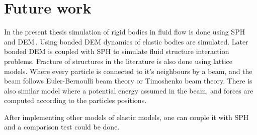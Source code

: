 \chapter{Future work}
\label{cha:future-work}


In the present thesis simulation of rigid bodies in fluid flow is done using SPH
and DEM\,. Using bonded DEM dynamics of elastic bodies are simulated.  Later
bonded DEM is coupled with SPH to simulate fluid structure interaction
problems. Fracture of structures in the literature is also done using lattice
models.  Where every particle is connected to it's neighbours by a beam, and the
beam follows Euler-Bernoulli beam theory or Timoshenko beam theory. There is
also similar model where a potential energy assumed in the beam, and forces are
computed according to the particles positions.


After implementing other models of elastic models, one can couple it with SPH
and a comparison test could be done.





